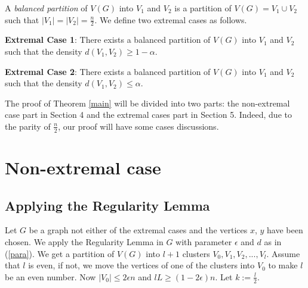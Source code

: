 \documentclass[11pt]{article}
\begin{document}
A {\em balanced partition} of $V(G)$ into $V_1$ and $V_2$ is a partition of $V(G)=V_1\cup V_2$ such that $|V_1|=|V_2|=\frac{n}{2}$. We define two extremal cases as follows.

{\bf Extremal Case 1}: There exists a balanced partition of $V(G)$ into $V_1$ and $V_2$ such that the density $d(V_1,V_2)\geq 1-\alpha$.

{\bf Extremal Case 2}: There exists a balanced partition of $V(G)$ into $V_1$ and $V_2$ such that the density $d(V_1,V_2)\leq \alpha$.

The proof of Theorem \ref{main} will be divided into two parts: the non-extremal case part in Section 4 and the extremal cases part in Section 5. Indeed, due to the parity of $\frac{n}{2}$, our proof will have some cases discussions.

%
%
%
%
%
%

\section{Non-extremal case}

\subsection{Applying the Regularity Lemma}
Let $G$ be a graph not either of the extremal cases and the vertices $x$, $y$ have been chosen. We apply the Regularity Lemma in $G$ with parameter $\epsilon $ and $d$ as in (\ref{para}). We get a partition of $V(G)$ into $l+1$ clusters $V_0, V_1, V_2,...,V_l$. Assume that $l$ is even, if not, we move the vertices of one of the clusters into $V_0$ to make $l$ be an even number. Now $|V_0|\leq 2\epsilon n$ and $lL\geq (1-2\epsilon )n$. Let $k:=\frac{l}{2}$.
\end{document}
